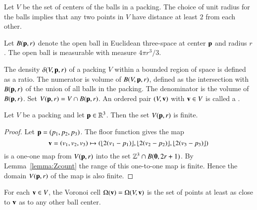 Let $ V$ be the set of centers of the balls in a
packing. The choice of unit radius for the
balls implies that any two points in $ V$ have distance at
least $2$ from each other. 
%

Let $B({\mathbf p},r)$ denote the open ball in
Euclidean three-space at center ${\mathbf p}$ and radius $r$.  The open ball
is measurable with measure $4\pi r^3/3$.
%
%

The density $\delta( V,{\mathbf p},r)$ of a packing $ V$ within a bounded
region of space is defined as a
ratio. The numerator is volume of $B( V,{\mathbf p},r)$, defined as
the intersection with
$B({\mathbf p},r)$ of the union of all balls in the packing.
The denominator is the volume of $B({\mathbf p},r)$.
Set
$ V({\mathbf p},r) =  V \cap
B({\mathbf p},r)$. %
An ordered pair $( V,{\mathbf v})$ with ${\mathbf v}\in V$ is called a .
%
%
%

\begin{lemma}
\label{lemma:V-finite}
Let $ V$ be a packing and let ${\mathbf p}\in\mathbb{R}^3$.
Then the set $ V({\mathbf p},r)$ is finite.
\end{lemma}

\begin{proof}  Let ${\mathbf p} = (p_1,p_2,p_3)$. The floor function gives the map
\begin{displaymath}{\mathbf v}=(v_1,v_2,v_3)\mapsto (\lfloor 2(v_1-p_1)
\rfloor, \lfloor 2(v_2-p_2) \rfloor, \lfloor 2(v_3-p_3) \rfloor)\end{displaymath}
is a one-one map from $ V({\mathbf p},r)$ into the set $\mathbb{Z}^3\cap B({\mathbf 0},2r + 1)$.  By Lemma~\ref{lemma:Zcount} the range of this one-to-one map is finite. 
Hence the domain $ V({\mathbf p},r)$ of the map is also finite.
\end{proof}
%


\begin{definition}\label{def:voronoi}
% 
For each ${\mathbf v}\in  V$, the Voronoi cell
$\Omega({\mathbf v})=\Omega( V,{\mathbf v})$
is the set of points at least as close to ${\mathbf v}$ as to
any other ball center. 
\end{definition}


